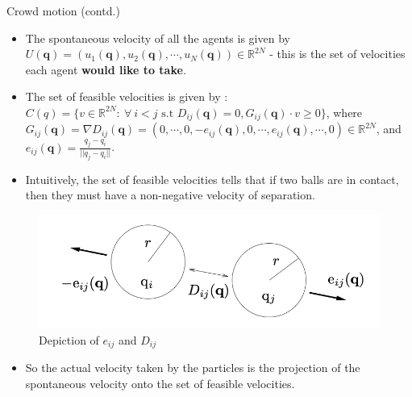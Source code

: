\documentclass[8pt,aspectratio=169]{beamer}
\begin{document}
\begin{frame}{Crowd motion (contd.)}
    \begin{itemize}
        \item The spontaneous velocity of all the agents is given by $U(\boldsymbol{q}) = (u_1(\boldsymbol{q}), u_2(\boldsymbol{q}), \cdots, u_N(\boldsymbol{q})) \in \mathbb{R}^{2N}$ - this is the set of velocities each agent \textbf{would like to take}.
        \item The set of feasible velocities is given by : $C(q) = \{v \in \mathbb{R}^{2N}: \ \forall \ i<j \text{ s.t } D_{ij}(\boldsymbol{q}) = 0, G_{ij}(\boldsymbol{q})\cdot v \geq 0\}$, where $G_{ij}(\boldsymbol{q}) = \nabla D_{ij}(\boldsymbol{q}) = (0, \cdots, 0, -e_{ij}(\boldsymbol{q}), 0, \cdots, e_{ij}(\boldsymbol{q}), \cdots, 0) \in \mathbb{R}^{2N}$, and $e_{ij}(\boldsymbol{q}) = \frac{q_j - q_i}{||q_j - q_i||}$.
        \item Intuitively, the set of feasible velocities tells that if two balls are in contact, then they must have a non-negative velocity of separation.
    \end{itemize}
    \begin{figure}[h]
        \centering
        \includegraphics[width=0.4\linewidth]{separation.png}
        \caption{Depiction of $e_{ij}$ and $D_{ij}$}
        \label{fig:enter-label}
    \end{figure}
    \begin{itemize}
        \item So the actual velocity taken by the particles is the projection of the spontaneous velocity onto the set of feasible velocities.
    \end{itemize}
\end{frame}
\end{document}
